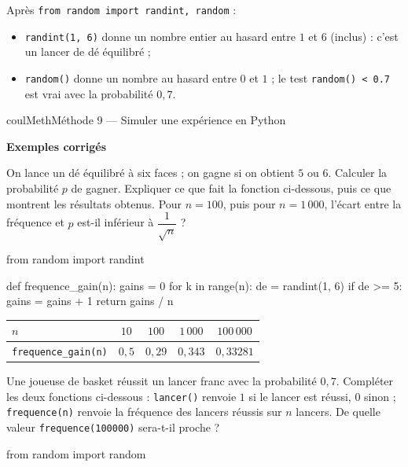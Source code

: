 \documentclass[11pt,a4paper]{article}
\makeatletter
\newcounter{lycee@signet}
\newcommand{\signet}[3][]{\stepcounter{lycee@signet}%
  \edef\lycee@dest{\if\relax\detokenize{#1}\relax
    signet.\arabic{lycee@signet}\else#1\fi}%
  \hypertarget{\lycee@dest}{}\bookmark[level=#2,dest=\lycee@dest]{#3}}
\newcounter{methode}
\newenvironment{methodebox}[1][Méthode]{\stepcounter{methode}%
  \begin{boitecours}[phantom={\signet[methode-\arabic{methode}]{2}{#1}}]{coulMeth}{#1}}%
  {\end{boitecours}}
\newcommand{\etape}[1]{\par\smallskip\textbf{\color{coulMeth}#1}\par\nobreak\smallskip}
\newcommand{\etapeexemples}{\etape{Exemples corrigés}}
\makeatother
\begin{document}
\begin{remarquebox}[En Python]
Après \texttt{from random import randint, random} :
\begin{itemize}
  \item \texttt{randint(1, 6)} donne un nombre entier au hasard entre $1$ et $6$
    (inclus) : c'est un lancer de dé équilibré ;
  \item \texttt{random()} donne un nombre au hasard entre $0$ et $1$ ; le test
    \texttt{random() < 0.7} est vrai avec la probabilité $0{,}7$.
\end{itemize}
\end{remarquebox}

\begin{methodebox}[Méthode 9 --- Simuler une expérience en Python]
\etapeexemples
\begin{questions}[label=\alph*)]
  \item On lance un dé équilibré à six faces ; on gagne si on obtient $5$ ou $6$.
    Calculer la probabilité $p$ de gagner. Expliquer ce que fait la fonction
    ci-dessous, puis ce que montrent les résultats obtenus. Pour $n=100$, puis pour
    $n=1\,000$, l'écart entre la fréquence et $p$ est-il inférieur à
    $\dfrac{1}{\sqrt{n}}$ ?
\end{questions}
\begin{python}
from random import randint

def frequence_gain(n):
    gains = 0
    for k in range(n):
        de = randint(1, 6)
        if de >= 5:
            gains = gains + 1
    return gains / n
\end{python}
\begin{center}
\renewcommand{\arraystretch}{1.5}
\begin{tabular}{|l|c|c|c|c|}
\hline
$n$ & $10$ & $100$ & $1\,000$ & $100\,000$ \\
\hline
\texttt{frequence\_gain(n)} & $0{,}5$ & $0{,}29$ & $0{,}343$ & $0{,}33281$ \\
\hline
\end{tabular}
\end{center}
\begin{questions}[label=\alph*),start=2]
  \item Une joueuse de basket réussit un lancer franc avec la probabilité $0{,}7$.
    Compléter les deux fonctions ci-dessous : \texttt{lancer()} renvoie $1$ si le
    lancer est réussi, $0$ sinon ; \texttt{frequence(n)} renvoie la fréquence des
    lancers réussis sur $n$ lancers. De quelle valeur \texttt{frequence(100000)}
    sera-t-il proche ?
\end{questions}
\begin{python}
from random import random


\end{python}
\end{methodebox}
\end{document}
